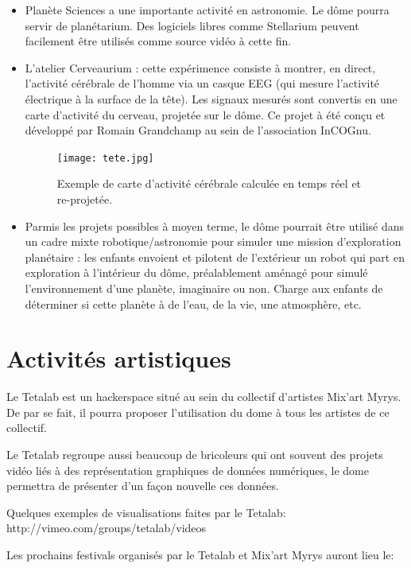 \documentclass[a4paper,12pt]{report}
\begin{document}
\begin{itemize}
	\item Planète Sciences a une importante activité en astronomie. Le dôme
	pourra servir de planétarium. Des logiciels libres comme Stellarium peuvent
	facilement être utilisés comme source vidéo à cette fin.

	\item L'atelier Cerveaurium : cette expérimence consiste à montrer, en
	direct, l'activité cérébrale de l'homme via un casque EEG (qui mesure
	l'activité électrique à la surface de la tête). Les signaux mesurés sont
	convertis en une carte d'activité du cerveau, projetée sur le dôme. Ce
	projet à été conçu et développé par Romain Grandchamp au sein de
	l'association InCOGnu.

    \begin{figure}[!h]
    \centering
    \texttt{[image: tete.jpg]}
	\caption{Exemple de carte d'activité cérébrale calculée en temps réel et re-projetée.}
    \end{figure}


	\item Parmis les projets possibles à moyen terme, le dôme pourrait être
	utilisé dans un cadre mixte robotique/astronomie pour simuler une mission
	d'exploration planétaire : les enfants envoient et pilotent de l'extérieur
	un robot qui part en exploration à l'intérieur du dôme, préalablement
	aménagé pour simulé l'environnement d'une planète, imaginaire ou non.
	Charge aux enfants de déterminer si cette planète à de l'eau, de la vie,
	une atmosphère, etc.

\end{itemize}

\section{Activités artistiques}

Le Tetalab est un hackerspace situé au sein du collectif d'artistes Mix'art Myrys.
De par se fait, il pourra proposer l'utilisation du dome à tous les artistes de ce 
collectif.

Le Tetalab regroupe aussi beaucoup de bricoleurs qui ont souvent des projets vidéo
liés à des représentation graphiques de données numériques, le dome permettra de 
présenter d'un façon nouvelle ces données.

Quelques exemples de visualisations faites par le Tetalab: http://vimeo.com/groups/tetalab/videos

Les prochains festivals organisés par le Tetalab et Mix'art Myrys auront lieu le:
\end{document}
